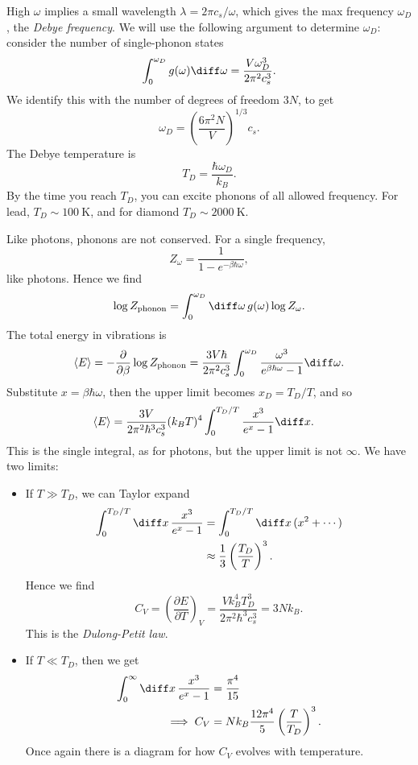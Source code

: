 \documentclass[12pt]{article}
\begin{document}
High $\omega$ implies a small wavelength $\lambda = 2\pi c_s/\omega$, which gives the max frequency $\omega_D$, the \emph{Debye frequency}. We will use the following argument to determine $\omega_D$: consider the number of single-phonon states
\[
\int_0^{\omega_D} g(\omega) \diff \omega = \frac{V \omega_D^3}{2 \pi^2 c_s^3}.
\]
We identify this with the number of degrees of freedom $3N$, to get
\[
\omega_D = \left( \frac{6\pi^2 N}{V} \right)^{1/3} c_s.
\]
The Debye temperature is
\[
T_D = \frac{\hbar \omega_D}{k_B}.
\]
By the time you reach $T_D$, you can excite phonons of all allowed frequency. For lead, $T_D \sim \qty{100}{\kelvin}$, and for diamond $T_D \sim \qty{2000}{\kelvin}$.

Like photons, phonons are not conserved. For a single frequency,
\[
Z_\omega = \frac{1}{1 - e^{-\beta \hbar \omega}},
\]
like photons. Hence we find
\[
\log Z_{\mathrm{phonon}} = \int_0^{\omega_D} \diff \omega\, g(\omega) \log Z_\omega.
\]
The total energy in vibrations is
\[
\langle E \rangle = - \frac{\partial}{\partial \beta} \log Z_{\mathrm{phonon}} = \frac{3 V \hbar}{2 \pi^2 c_s^3}\int_0^{\omega_D} \frac{\omega^3}{e^{\beta \hbar \omega} - 1} \diff \omega.
\]
Substitute $x = \beta \hbar \omega$, then the upper limit becomes $x_D = T_D/T$, and so
\begin{align*}
	\langle E \rangle &= \frac{3V}{2 \pi^2 \hbar^3 c_s^3} (k_B T)^4 \int_0^{T_D/T} \frac{x^3}{e^x - 1} \diff x.
\end{align*}
This is the single integral, as for photons, but the upper limit is not $\infty$. We have two limits:
\begin{itemize}
	\item If $T \gg T_D$, we can Taylor expand
		\begin{align*}
			\int_0^{T_D/T}\diff x \, \frac{x^3}{e^x - 1} &= \int_0^{T_D/T}\diff x \, (x^2 + \cdots) \\
								     &\approx \frac{1}{3} \left( \frac{T_D}{T} \right)^3.
		\end{align*}
		Hence we find
		\[
		C_V = \left( \frac{\partial E}{\partial T} \right)_V = \frac{V k_B^4 T_D^3}{2\pi^2 \hbar^3 c_s^3} = 3N k_B.
		\]
		This is the \emph{Dulong-Petit law}.
	\item If $T \ll T_D$, then we get
		\begin{align*}
			\int_0^\infty \diff x \, \frac{x^3}{e^x - 1} &= \frac{\pi^4}{15} \\
			\implies C_V &= N k_B \frac{12 \pi^4}{5} \left( \frac{T}{T_D} \right)^3.
		\end{align*}
		Once again there is a diagram for how $C_V$ evolves with temperature.
\end{itemize}
\end{document}
